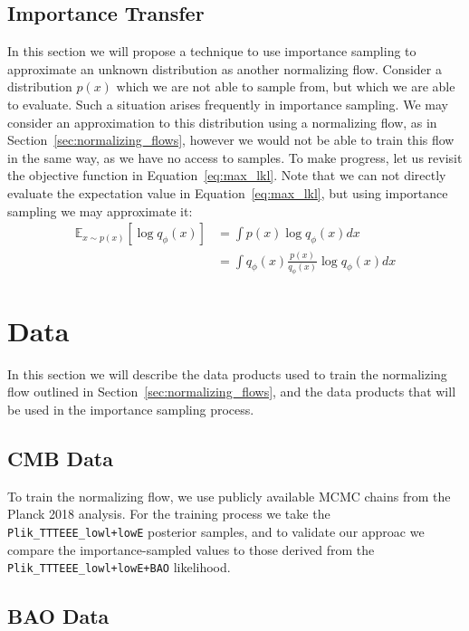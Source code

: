 \documentclass[fleqn,usenatbib]{mnras}
\begin{document}
\subsection{Importance Transfer}
\label{sec:importance_transfer}

In this section we will propose a technique to use importance sampling to approximate an unknown distribution as another normalizing flow. Consider a distribution $p(x)$ which we are not able to sample from, but which we are able to evaluate. Such a situation arises frequently in importance sampling. We may consider an approximation to this distribution using a normalizing flow, as in Section~\ref{sec:normalizing_flows}, however we would not be able to train this flow in the same way, as we have no access to samples. To make progress, let us revisit the objective function in Equation~\ref{eq:max_lkl}. Note that we can not directly evaluate the expectation value in Equation~\ref{eq:max_lkl}, but using importance sampling we may approximate it:
\begin{equation}
\begin{aligned}
\mathbb E_{x\sim p(x)}[\log q_\phi(x)] &= \int p(x) \log q_\phi(x) dx \\
    &= \int q_\phi(x) \frac{p(x)}{q_\phi(x)} \log q_\phi(x) dx
\end{aligned}
\end{equation}


\section{Data}
\label{sec:data}

In this section we will describe the data products used to train the normalizing flow outlined in Section~\ref{sec:normalizing_flows}, and the data products that will be used in the importance sampling process.

\subsection{CMB Data}

To train the normalizing flow, we use publicly available MCMC chains from the Planck 2018 analysis. For the training process we take the {\tt Plik\_TTTEEE\_lowl+lowE} posterior samples, and to validate our approac we compare the importance-sampled values to those derived from the {\tt Plik\_TTTEEE\_lowl+lowE+BAO} likelihood.

\subsection{BAO Data}
\label{sec:bao_data}
\end{document}
